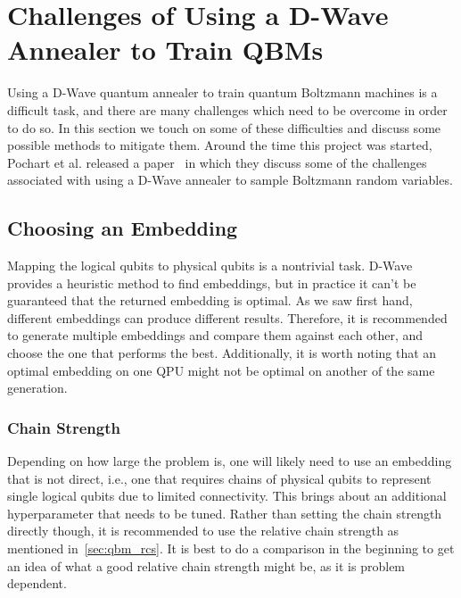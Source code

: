 \clearpage
\section{Challenges of Using a D-Wave Annealer to Train QBMs}\label{sec:challenges}
Using a D-Wave quantum annealer to train quantum Boltzmann machines is a difficult task, and there are many challenges which need to be overcome in order to do so.
In this section we touch on some of these difficulties and discuss some possible methods to mitigate them.
Around the time this project was started, Pochart et al. released a paper~\cite{pochart_2021} in which they discuss some of the challenges associated with using a D-Wave annealer to sample Boltzmann random variables.

\subsection{Choosing an Embedding}
Mapping the logical qubits to physical qubits is a nontrivial task.
D-Wave provides a heuristic method to find embeddings, but in practice it can't be guaranteed that the returned embedding is optimal.
As we saw first hand, different embeddings can produce different results.
Therefore, it is recommended to generate multiple embeddings and compare them against each other, and choose the one that performs the best.
Additionally, it is worth noting that an optimal embedding on one QPU might not be optimal on another of the same generation.

\subsubsection{Chain Strength}
Depending on how large the problem is, one will likely need to use an embedding that is not direct, i.e., one that requires chains of physical qubits to represent single logical qubits due to limited connectivity.
This brings about an additional hyperparameter that needs to be tuned.
Rather than setting the chain strength directly though, it is recommended to use the relative chain strength as mentioned in~\cref{sec:qbm_rcs}.
It is best to do a comparison in the beginning to get an idea of what a good relative chain strength might be, as it is problem dependent.

